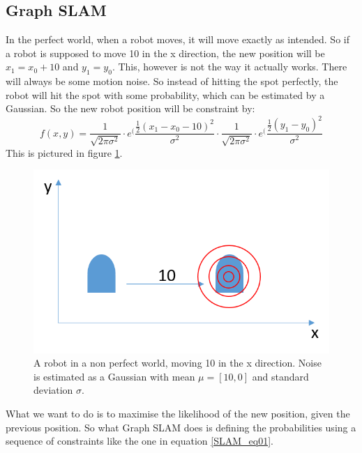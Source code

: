 \subsection{Graph SLAM}
In the perfect world, when a robot moves, it will move exactly as intended. So if a robot is supposed to move 10 in the x direction, the new position will be $x_1 = x_0 + 10$ and $y_1 = y_0$. 
This, however is not the way it actually works. There will always be some motion noise. So instead of hitting the spot perfectly, the robot will hit the spot with some probability, which can be estimated by a Gaussian. So the new robot position will be constraint by:
\begin{equation}
f(x,y)=\frac{1}{\sqrt{2\pi\sigma^2}} \cdot e^(\frac{\frac{1}{2}(x_1-x_0-10)^2}{\sigma^2} \cdot \frac{1}{\sqrt{2\pi\sigma^2}} \cdot e^(\frac{\frac{1}{2}(y_1-y_0)^2}{\sigma^2}
\label{SLAM_eq01}
\end{equation}
This is pictured in figure \ref{SLAM_fig02}.
\begin{figure}[h!]
    \includegraphics[scale=0.5]{billeder/GraphSLAM02.png}
    \caption{A robot in a non perfect world, moving 10 in the x direction. Noise is estimated as a Gaussian with mean $\mu = [10,0]$ and standard deviation $\sigma$.}
    \label{SLAM_fig02}
\end{figure}
What we want to do is to maximise the likelihood of the new position, given the previous position.
So what Graph SLAM does is defining the probabilities using a sequence of constraints like the one in equation \ref{SLAM_eq01}. 
